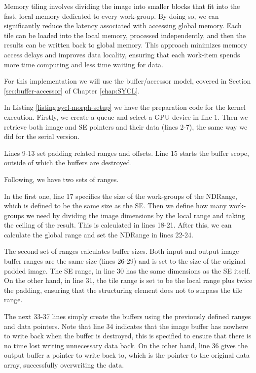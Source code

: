 Memory tiling involves dividing the image into smaller blocks that fit into the fast, local memory dedicated to every work-group.
By doing so, we can significantly reduce the latency associated with accessing global memory.
Each tile can be loaded into the local memory, processed independently, and then the results can be written back to global memory.
This approach minimizes memory access delays and improves data locality, ensuring that each work-item spends more time computing and less time waiting for data.

For this implementation we will use the buffer/accessor model, covered in Section \ref{sec:buffer-accessor} of Chapter \ref{chap:SYCL}.
\pagebreak



In Listing \ref{listing:sycl-morph-setup} we have the preparation code for the kernel execution.
Firstly, we create a queue and select a GPU device in line 1.
Then we retrieve both image and SE pointers and their data (lines 2-7), the same way we did for the serial version.

Lines 9-13 set padding related ranges and offsets.
Line 15 starts the buffer scope, outside of which the buffers are destroyed.

Following, we have two sets of ranges.

In the first one, line 17 specifies the size of the work-groups of the NDRange, which is defined to be the same size as the SE.
Then we define how many work-groups we need by dividing the image dimensions by the local range and taking the ceiling of the result.
This is calculated in lines 18-21.
After this, we can calculate the global range and set the NDRange in lines 22-24.

The second set of ranges calculates buffer sizes.
Both input and output image buffer ranges are the same size (lines 26-29) and is set to the size of the original padded image.
The SE range, in line 30 has the same dimensions as the SE itself.
On the other hand, in line 31, the tile range is set to be the local range plus twice the padding, ensuring that the structuring element does not to surpass the tile range.

The next 33-37 lines simply create the buffers using the previously defined ranges and data pointers.
Note that line 34 indicates that the image buffer has nowhere to write back when the buffer is destroyed, this is specified to ensure that there is no time lost writing unnecessary data back.
On the other hand, line 36 gives the output buffer a pointer to write back to, which is the pointer to the original data array, successfully overwriting the data.
\pagebreak


